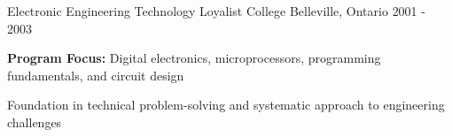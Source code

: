 
\begin{cventries}
  \cventry
    {Electronic Engineering Technology} %
    {Loyalist College} %
    {Belleville, Ontario} %
    {2001 - 2003} %
    {
      \begin{cvitems} %
         \item {\textbf{Program Focus:} Digital electronics, microprocessors, programming fundamentals, and circuit design}
         \item {Foundation in technical problem-solving and systematic approach to engineering challenges}
      \end{cvitems}
    }
    
\end{cventries}
